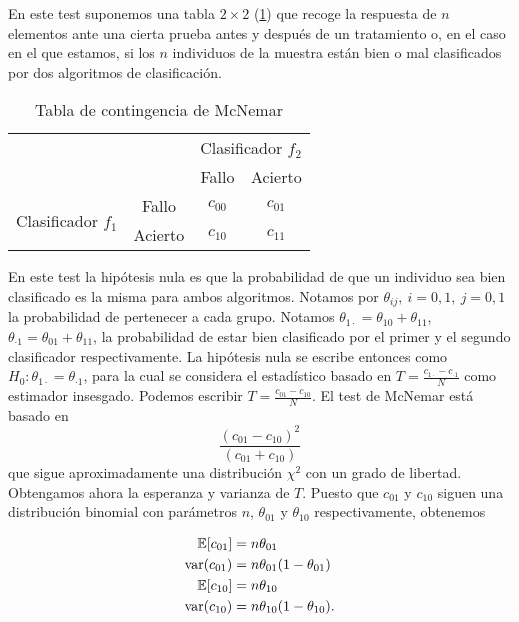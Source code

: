 	En este test suponemos una tabla $2 \times 2$ (\ref{Tb:McNemar}) que recoge 
la respuesta de $n$ elementos ante una cierta prueba antes y 
después de un tratamiento o, en el caso en el que estamos, si 
los $n$ individuos de la muestra están bien o mal 
clasificados por dos algoritmos de clasificación.
	
\begin{table}[H]
\centering
\caption{Tabla de contingencia de McNemar}
\label{Tb:McNemar}
\begin{tabular}{|lc|cc|}
\hline
                                                          &       & \multicolumn{2}{c|}{Clasificador $f_2$} \\ \cline{3-4} 
                                                          &         & Fallo              & Acierto            \\ \hline
\multicolumn{1}{|c|}{\multirow{2}{*}{Clasificador $f_1$}} & Fallo   & $c_{00}$           & $c_{01}$           \\
\multicolumn{1}{|c|}{}                                    & Acierto & $c_{10}$           & $c_{11}$           \\ \hline
\end{tabular}
\end{table}

	En este test la hipótesis nula es que la probabilidad de 
que un individuo sea bien clasificado es la misma para ambos 
algoritmos. Notamos por $\theta_{ij},\ i=0,1,\ j=0,1$ la 
probabilidad de pertenecer a cada grupo. Notamos 
$\theta_{1 \cdot} = \theta_{10} + \theta_{11}$, 
$\theta_{\cdot 1} = \theta_{01} + \theta_{11}$, la 
probabilidad de estar bien clasificado por el primer y el 
segundo clasificador respectivamente. La hipótesis nula se 
escribe entonces como $H_0: \theta_{1 \cdot} = 
\theta_{\cdot 1}$, para la cual se considera el estadístico 
basado en $T = \frac{c_{1 \cdot} - c_{\cdot 1}}{N}$ como 
estimador insesgado. Podemos escribir $T = \frac{c_{01} - 
c_{10}}{N}$. El test de McNemar está basado en
	\[ \frac{(c_{01} - c_{10})^2}{(c_{01} + c_{10})} \]
	que sigue aproximadamente una distribución $\chi^2$ con 
un grado de libertad. Obtengamos ahora la esperanza y 
varianza de $T$. Puesto que $c_{01}$ y $c_{10}$ siguen una 
distribución binomial con parámetros $n$, $\theta_{01}$ y 
$\theta_{10}$ respectivamente, obtenemos

\begin{align*}
	\mathbb{E}[c_{01}] 	&= n \theta_{01} \\
	\text{var}(c_{01}) &= n \theta_{01} (1 - \theta_{01}) \\
	\mathbb{E}[c_{10}] 	&= n \theta_{10} \\
	\text{var}(c_{10}) &= n \theta_{10} (1 - \theta_{10}).
\end{align*}

